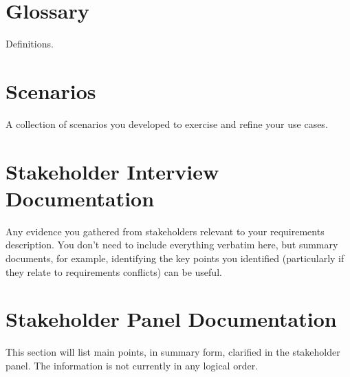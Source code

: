 \documentclass{l3deliverable}
\begin{document}
\section{Glossary}

Definitions.

\section{Scenarios}

A collection of scenarios you developed to exercise and refine your
use cases.

\section{Stakeholder Interview Documentation}

Any evidence you gathered from stakeholders relevant to your
requirements description.  You don't need to include everything
verbatim here, but summary documents, for example, identifying the key
points you identified (particularly if they relate to requirements
conflicts) can be useful.

\section{Stakeholder Panel Documentation}

This section will list main points, in summary form, clarified in the
stakeholder panel. The information is not currently in any logical order.
\end{document}
